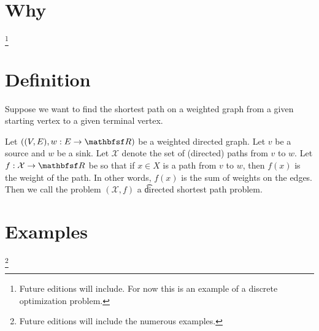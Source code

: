 

\section*{Why}
\footnote{Future editions will include. For now this is an example of a discrete optimization problem.}
\section*{Definition}

Suppose we want to find the shortest path on a weighted graph from a given starting vertex to a given terminal vertex.

Let $((V, E), w: E \to \R )$ be a weighted directed graph.
Let $v$ be a source and $w$ be a sink.
Let $\mathcal{X} $ denote the set of (directed) paths from $v$ to $w$.
Let $f: \mathcal{X}  \to \R $ be so that if $x \in X$ is a path from $v$ to $w$, then $f(x)$ is the weight of the path.
In other words, $f(x)$ is the sum of weights on the edges.
Then we call the problem $(\mathcal{X} , f)$ a \t{directed shortest path problem}.

\section*{Examples}
\footnote{Future editions will include the numerous examples.}
\blankpage